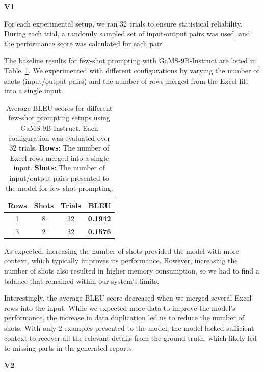 \documentclass[fleqn,moreauthors,10pt]{ds_report}
\begin{document}
\vspace{1em} %
\noindent \textbf{V1}
\vspace{0.5em} %

For each experimental setup, we ran 32 trials to ensure statistical reliability. During each trial, a randomly sampled
set of input-output pairs was used, and the performance score was calculated for each pair.


The baseline results for few-shot prompting with GaMS-9B-Instruct \cite{huggingface2025gams9b} are listed in Table~\ref{tab:bleu-results}. We experimented with different configurations by varying the number of shots (input/output pairs) and the number of rows merged from the Excel file into a single input.
\begin{table}[h!]
    \centering
    \caption{Average BLEU scores for different few-shot prompting setups using GaMS-9B-Instruct. Each configuration was evaluated over 32 trials. \textbf{Rows}: The number of Excel rows merged into a single input. \textbf{Shots}: The number of input/output pairs presented to the model for few-shot prompting.}
    \label{tab:bleu-results}
    \small
    \begin{tabular}{@{}cccc@{}}
    \toprule
    \textbf{Rows} & \textbf{Shots} & \textbf{Trials} & \textbf{BLEU} \\
    \midrule
    1 & 8 & 32 & \textbf{0.1942} \\
    3 & 2 & 32 & \textbf{0.1576} \\
    \bottomrule
    \end{tabular}
\end{table}

As expected, increasing the number of shots provided the model with more context, which typically improves its performance. However, increasing the number of shots also resulted in higher memory consumption, so we had to find a balance that remained within our system's limits.

Interestingly, the average BLEU score decreased when we merged several Excel rows into the input. While we expected more data to improve the model's performance, the increase in data duplication led us to reduce the number of shots. With only 2 examples presented to the model, the model lacked sufficient context to recover all the relevant details from the ground truth, which likely led to missing parts in the generated reports.

\vspace{1em} %
\noindent \textbf{V2}
\vspace{0.5em} %
\end{document}
